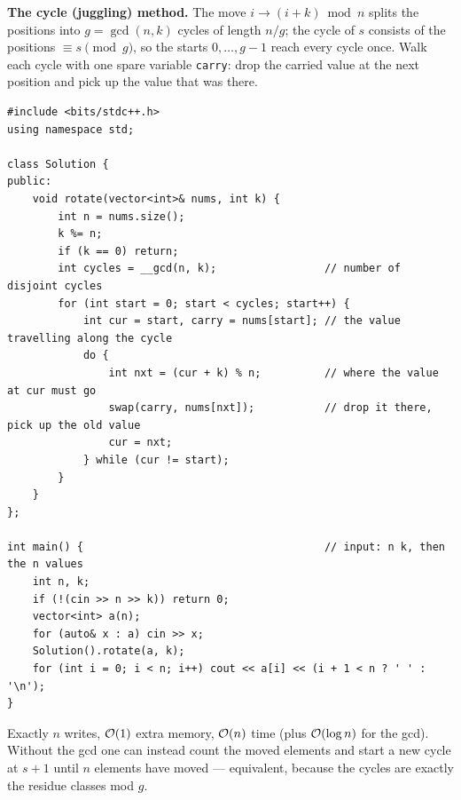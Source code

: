\begin{alternativebox}
\textbf{The cycle (juggling) method.} The move $i \to (i+k) \bmod n$ splits the positions into $g = \gcd(n,k)$ cycles of length $n/g$; the cycle of $s$ consists of the positions $\equiv s \pmod g$, so the starts $0, \dots, g-1$ reach every cycle once. Walk each cycle with one spare variable \texttt{carry}: drop the carried value at the next position and pick up the value that was there.
\begin{lstlisting}[style=cpp]
#include <bits/stdc++.h>
using namespace std;

class Solution {
public:
    void rotate(vector<int>& nums, int k) {
        int n = nums.size();
        k %= n;
        if (k == 0) return;
        int cycles = __gcd(n, k);                 // number of disjoint cycles
        for (int start = 0; start < cycles; start++) {
            int cur = start, carry = nums[start]; // the value travelling along the cycle
            do {
                int nxt = (cur + k) % n;          // where the value at cur must go
                swap(carry, nums[nxt]);           // drop it there, pick up the old value
                cur = nxt;
            } while (cur != start);
        }
    }
};

int main() {                                      // input: n k, then the n values
    int n, k;
    if (!(cin >> n >> k)) return 0;
    vector<int> a(n);
    for (auto& x : a) cin >> x;
    Solution().rotate(a, k);
    for (int i = 0; i < n; i++) cout << a[i] << (i + 1 < n ? ' ' : '\n');
}
\end{lstlisting}
Exactly $n$ writes, $\mathcal{O}(1)$ extra memory, $\mathcal{O}(n)$ time (plus $\mathcal{O}(\log n)$ for the gcd). Without the gcd one can instead count the moved elements and start a new cycle at $s+1$ until $n$ elements have moved --- equivalent, because the cycles are exactly the residue classes mod $g$.

\begin{diagrambox}
\end{diagrambox}
\end{alternativebox}

